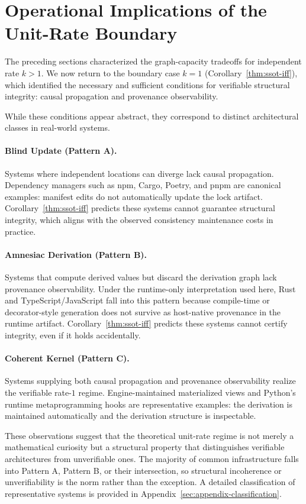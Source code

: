 \section{Operational Implications of the Unit-Rate Boundary}\label{sec:evaluation}

The preceding sections characterized the graph-capacity tradeoffs for independent rate $k > 1$. We now return to the boundary case $k = 1$ (Corollary~\ref{thm:ssot-iff}), which identified the necessary and sufficient conditions for verifiable structural integrity: causal propagation and provenance observability.

While these conditions appear abstract, they correspond to distinct architectural classes in real-world systems.

\paragraph{Blind Update (Pattern A).}
Systems where independent locations can diverge lack causal propagation. Dependency managers such as npm, Cargo, Poetry, and pnpm are canonical examples: manifest edits do not automatically update the lock artifact. Corollary~\ref{thm:ssot-iff} predicts these systems cannot guarantee structural integrity, which aligns with the observed consistency maintenance costs in practice.

\paragraph{Amnesiac Derivation (Pattern B).}
Systems that compute derived values but discard the derivation graph lack provenance observability. Under the runtime-only interpretation used here, Rust and TypeScript/JavaScript fall into this pattern because compile-time or decorator-style generation does not survive as host-native provenance in the runtime artifact. Corollary~\ref{thm:ssot-iff} predicts these systems cannot certify integrity, even if it holds accidentally.

\paragraph{Coherent Kernel (Pattern C).}
Systems supplying both causal propagation and provenance observability realize the verifiable rate-$1$ regime. Engine-maintained materialized views and Python's runtime metaprogramming hooks are representative examples: the derivation is maintained automatically and the derivation structure is inspectable.

These observations suggest that the theoretical unit-rate regime is not merely a mathematical curiosity but a structural property that distinguishes verifiable architectures from unverifiable ones. The majority of common infrastructure falls into Pattern A, Pattern B, or their intersection, so structural incoherence or unverifiability is the norm rather than the exception. A detailed classification of representative systems is provided in Appendix~\ref{sec:appendix-classification}.
